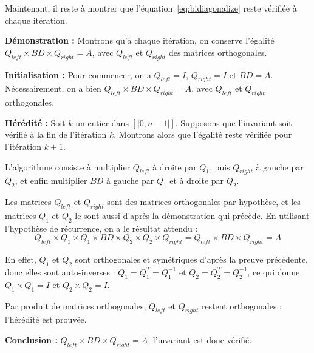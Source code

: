 Maintenant, il reste à montrer que l'équation~\ref{eq:bidiagonalize} reste vérifiée à chaque itération.

\bigbreak
\noindent\textbf{Démonstration :}
Montrons qu'à chaque itération, on conserve l'égalité $Q_{left} \times BD \times Q_{right} = A$, avec $Q_{left}$ et $Q_{right}$ des matrices orthogonales.

	\medbreak\noindent
	\textbf{Initialisation :} Pour commencer, on a $Q_{left} = I$, $Q_{right} = I$ et $BD = A$. 
	Nécessairement, on a bien $Q_{left} \times BD \times Q_{right} = A$, avec $Q_{left}$ et $Q_{right}$ orthogonales.

	\medbreak\noindent
	\textbf{Hérédité :} Soit $k$ un entier dans $[|0, n - 1|]$. Supposons que l'invariant soit vérifié à la fin de l'itération $k$.
	Montrons alors que l'égalité reste vérifiée pour l'itération $k + 1$.

	L'algorithme consiste à multiplier $Q_{left}$ à droite par $Q_1$, puis $Q_{right}$ à gauche par $Q_2$, et enfin multiplier $BD$ à gauche par $Q_1$ et à droite par $Q_2$.

	Les matrices $Q_{left}$ et $Q_{right}$ sont des matrices orthogonales par hypothèse, et les matrices $Q_1$ et $Q_2$ le sont aussi d'après la démonstration qui précède.
	En utilisant l'hypothèse de récurrence, on a le résultat attendu :
	\begin{equation*}
		Q_{left} \times Q_1 \times Q_1 \times BD \times Q_2 \times Q_2 \times Q_{right} = Q_{left} \times BD \times Q_{right} = A
	\end{equation*}

	En effet, $Q_1$ et $Q_2$ sont orthogonales et symétriques d'après la preuve précédente, donc elles sont auto-inverses : $Q_1 = Q_1^T = Q_1^{-1}$ et $Q_2 = Q_2^T = Q_2^{-1}$,
	ce qui donne $Q_1 \times Q_1 = I$ et $Q_2 \times Q_2 = I$.

	Par produit de matrices orthogonales, $Q_{left}$ et $Q_{right}$ restent orthogonales : l'hérédité est prouvée.

	\medbreak\noindent
	\textbf{Conclusion :} $Q_{left} \times BD \times Q_{right} = A$, l'invariant est donc vérifié.
\qedsymbol
\bigbreak